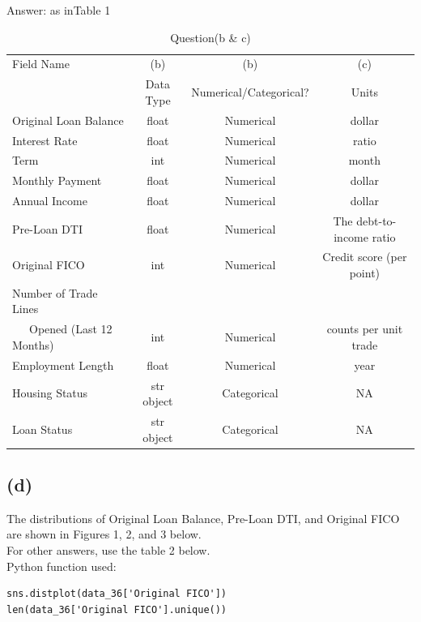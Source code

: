 \documentclass{homework}
\begin{document}
Answer: as inTable 1   \begin{table}
\centering
\caption{Question(b \& c)}
    \begin{tabular}{l|c|c|c}
        \hline
    Field Name          & (b)        & (b)            &  (c) \\
                        & Data Type  &  Numerical/Categorical?    & Units \\ \hline
    Original Loan Balance & float &  Numerical &   dollar \\ \hline
    Interest Rate   & float &  Numerical &   ratio \\ \hline
    Term         & int & Numerical &  month \\  \hline
    Monthly Payment  & float &  Numerical &   dollar \\ \hline
    Annual Income & float &  Numerical &   dollar \\ \hline
    Pre-Loan DTI & float &  Numerical &   The debt-to-income ratio   \\ \hline
    Original FICO  & int & Numerical &  Credit score (per point)\\ \hline
    Number of Trade Lines &&& \\
    \ \ \ Opened (Last 12 Months) & int & Numerical &  counts per unit trade \\ \hline
    Employment Length & float &  Numerical &  year  \\ \hline
    Housing Status & str object & Categorical & NA \\ \hline
    Loan Status  & str object & Categorical & NA \\ \hline
    \end{tabular}
\end{table}
   



\subsection*{(d)}   
The distributions of Original Loan Balance, Pre-Loan DTI, and Original FICO are shown in Figures 1, 2, and 3 below.\\
   For other answers, use the table 2 below. \\
      Python function used:
   \begin{verbatim}
sns.distplot(data_36['Original FICO'])
len(data_36['Original FICO'].unique())
\end{verbatim}
\end{document}
